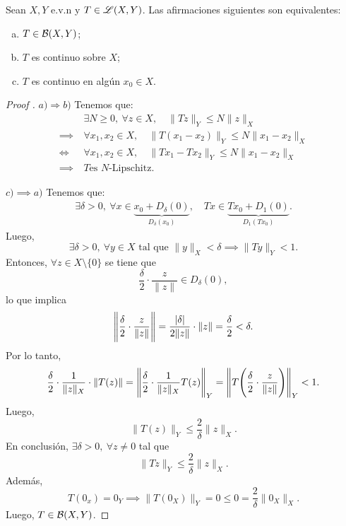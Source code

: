 \begin{theorem}
	Sean $X,Y$ e.v.n y $T \in \mathscr{L}(X,Y)$. Las afirmaciones siguientes son equivalentes:
	\begin{enumerate}[a)]
		\item $T \in \mathcal{B}(X,Y)$;

		\item $T$ es continuo sobre $X$;

		\item $T$ es continuo en algún $x_{0} \in X$.
	\end{enumerate}
\end{theorem}
\begin{proof}[Proof ]
	$\boxed{a) \Rightarrow b)}$ Tenemos que: 
	\begin{align*}
		& \exists N \geq 0,\ \forall z \in X, \quad \| Tz \|_{Y} \leq N \| z \|_{X} \\
		\implies \ & \forall x_{1},x_{2} \in X, \quad \| T(x_{1} - x_{2}) \|_{Y} \leq N \| x_{1} - x_{2} \|_{X} \\
		\iff \ & \forall x_{1},x_{2} \in X, \quad \| Tx_{1} - Tx_{2} \|_{Y} \leq N \| x_{1} - x_{2} \|_{X} \\
		\implies \ & T \text{es $N$-Lipschitz}
	.\end{align*} \par
	$\boxed{c) \implies a)}$ Tenemos que:
	\begin{align*}
		\exists \delta > 0,\ \forall x \in \underbrace{x_{0} + D_{\delta}(0)}_{D_{\delta}(x_{0})}, \quad Tx \in \underbrace{Tx_{0} + D_{1}(0)}_{D_{1}(Tx_{0})}
	.\end{align*}
	Luego,
	\[ \exists \delta > 0,\ \forall y \in X \text{ tal que } \| y \|_{X} < \delta \implies \| Ty \|_{Y} < 1. \]
	Entonces, $\forall z \in X \setminus \{0\}$ se tiene que
	\[ \frac{\delta}{2} \cdot \frac{z}{\| z \|} \in D_{\delta}(0), \]
	lo que implica
	\[ \Bigg{\|} \frac{\delta}{2} \cdot \frac{z}{\| z \|} \Bigg{\|} = \frac{|\delta|}{2 \| z \|} \cdot \| z \| = \frac{\delta}{2} < \delta. \]
	Por lo tanto,
	\[ \frac{\delta}{2} \cdot \frac{1}{\| z \|_{X}} \cdot \| T(z) \| = \Bigg{\|} \frac{\delta}{2} \cdot \frac{1}{\| z \|_{X}} T(z) \Bigg{\|}_{Y} = \Bigg{\|} T \Bigg( \frac{\delta}{2} \cdot \frac{z}{\| z \|} \Bigg) \Bigg{\|}_{Y} < 1. \]
	Luego, 
	\[ \| T(z) \|_{Y} \leq \frac{2}{\delta} \| z \|_{X}. \]
	En conclusión, $\exists \delta > 0,\ \forall z \neq 0$ tal que
	\[ \| Tz \|_{Y} \leq \frac{2}{\delta} \| z \|_{X}. \]
	Además,
	\[ T(0_{x}) = 0_{Y} \implies \| T(0_{X}) \|_{Y} = 0 \leq 0 = \frac{2}{\delta} \| 0_{X} \|_{X}. \]
	Luego, $T \in \mathcal{B}(X,Y)$.
\end{proof}
